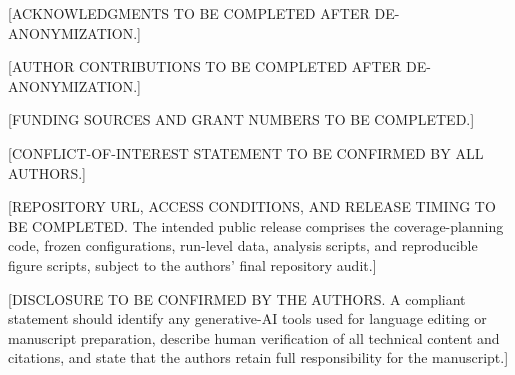 \documentclass[ASNA,twocolumn]{USG}
\begin{document}
[ACKNOWLEDGMENTS TO BE COMPLETED AFTER DE-ANONYMIZATION.]

[AUTHOR CONTRIBUTIONS TO BE COMPLETED AFTER DE-ANONYMIZATION.]

[FUNDING SOURCES AND GRANT NUMBERS TO BE COMPLETED.]

[CONFLICT-OF-INTEREST STATEMENT TO BE CONFIRMED BY ALL AUTHORS.]

[REPOSITORY URL, ACCESS CONDITIONS, AND RELEASE TIMING TO BE COMPLETED. The intended public release comprises the coverage-planning code, frozen configurations, run-level data, analysis scripts, and reproducible figure scripts, subject to the authors' final repository audit.]

[DISCLOSURE TO BE CONFIRMED BY THE AUTHORS. A compliant statement should identify any generative-AI tools used for language editing or manuscript preparation, describe human verification of all technical content and citations, and state that the authors retain full responsibility for the manuscript.]


\end{document}
